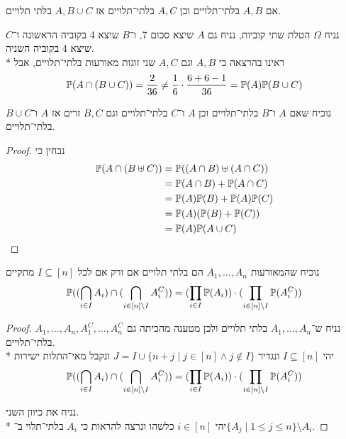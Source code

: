 \Subquestion{}
אם $A, B$ בלתי־תלויים וכן $A, C$ בלתי־תלויים אז $A, B \cup C$ בלתי תלויים.
\begin{solution}
	נניח $\Omega$ הטלת שתי קוביות, נניח גם $A$ שיצא סכום 7, ו־$B$ שיצא 4 בקוביה הראשונה ו־$C$ שיצא 4 בקוביה השניה. \\*
	ראינו בהרצאה כי $A, B$ וגם $A, C$ שני זוגות מאורעות בלתי־תלויים, אבל
	\[
		\mathbb{P}(A \cap (B \cup C)) = \frac{2}{36} \ne \frac{1}{6} \cdot \frac{6 + 6 - 1}{36} = \mathbb{P}(A) \mathbb{P}(B \cup C)
	\]
\end{solution}

\Subquestion{}
נוכיח שאם $A$ ו־$B$ בלתי־תלויים וכן $A$ ו־$C$ בלתי־תלויים וגם $B, C$ זרים אז $A$ ו־$B \cup C$ בלתי־תלויים.
\begin{proof}
	נבחין כי
	\begin{align*}
		\mathbb{P}(A \cap (B \uplus C))
		& = \mathbb{P}((A \cap B) \uplus (A \cap C)) \\
		& = \mathbb{P}(A \cap B) + \mathbb{P}(A \cap C) \\
		& = \mathbb{P}(A) \mathbb{P}(B) + \mathbb{P}(A) \mathbb{P}(C) \\
		& = \mathbb{P}(A)(\mathbb{P}(B) + \mathbb{P}(C)) \\
		& = \mathbb{P}(A) \mathbb{P}(A \cup C)
	\end{align*}
\end{proof}

\Question{}
נוכיח שהמאורעות $A_1, \dots, A_n$ הם בלתי תלויים אם ורק אם לכל $I \subseteq [n]$ מתקיים
\[
	\mathbb{P}( (\bigcap_{i \in I} A_i) \cap (\bigcap_{i \in [n] \setminus I} A_i^C))
	= (\prod_{i \in I} \mathbb{P}(A_i)) \cdot (\prod_{i \in [n] \setminus I} \mathbb{P}(A_i^C))
\]
\begin{proof}
	נניח ש־$A_1, \dots, A_n$ בלתי תלויים ולכן מטענה מהכיתה גם $A_1, \dots, A_n, A_1^C, \dots, A_n^C$ בלתי־תלויים. \\*
	יהי $I \subseteq [n]$ ונגדיר $J = I \cup \{ n + j \mid j \in [n] \land j \notin I \}$ ונקבל מאי־התלות ישירות
	\[
		\mathbb{P}( (\bigcap_{i \in I} A_i) \cap (\bigcap_{i \in [n] \setminus I} A_i^C))
		= (\prod_{i \in I} \mathbb{P}(A_i)) \cdot (\prod_{i \in [n] \setminus I} \mathbb{P}(A_i^C))
	\]

	נניח את כיוון השני. \\*
	יהי $i \in [n]$ כלשהו ונרצה להראות כי $A_i$ בלתי־תלוי ב־$\{ A_j \mid 1 \le j \le n \} \setminus A_i$.
\end{proof}


